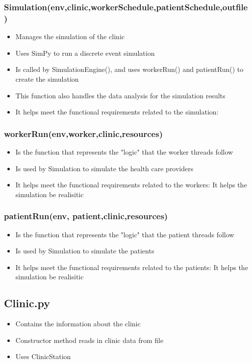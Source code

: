 \documentclass[12pt]{article}
\begin{document}
\subsubsection{Simulation(env,clinic,workerSchedule,patientSchedule,outfile)}
\begin{itemize}
	\item Manages the simulation of the clinic
	\item Uses SimPy to run a discrete event simulation
	\item Is called by SimulationEngine(), and uses workerRun() and patientRun() to create the simulation
	\item This function also handles the data analysis for the simulation results
	\item It helps meet the functional requirements related to the simulation:
\end{itemize}
\subsubsection{workerRun(env,worker,clinic,resources)}
\begin{itemize}
	\item Is the function that represents the "logic" that the worker threads follow
	\item Is used by Simulation to simulate the health care providers
	\item It helps meet the functional requirements related to the workers:
	It helps the simulation be realisitic
\end{itemize}
\subsubsection{patientRun(env, patient,clinic,resources)}
\begin{itemize}
	\item Is the function that represents the "logic" that the patient threads follow
	\item Is used by Simulation to simulate the patients
	\item It helps meet the functional requirements related to the patients:
	It helps the simulation be realisitic
\end{itemize}

\subsection{Clinic.py}
\begin{itemize}  
\item Contains the information about the clinic
\item Constructor method reads in clinic data from file
\item Uses ClinicStation
\end{itemize}
\end{document}
